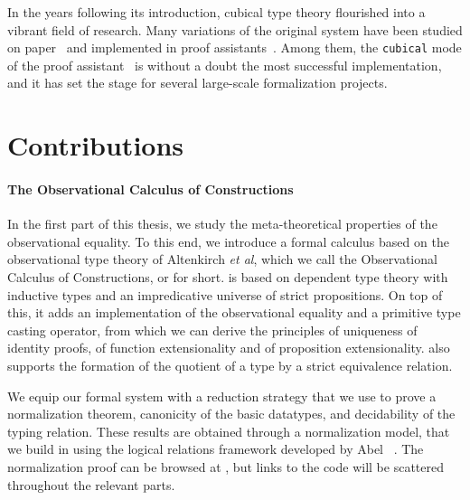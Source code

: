 In the years following its introduction, cubical type theory flourished into a 
vibrant field of research.
% 
Many variations of the original system have been studied on paper~\cite{AngiuliHouHarper18,ABCFHL}
and implemented in proof assistants~\cite{Cubicaltt, redtt}.
% 
Among them, the \texttt{cubical} mode of the \Agda proof assistant~
is without a doubt the most successful implementation, and it has set the stage for several 
large-scale formalization projects.


\section{Contributions}

\paragraph{The Observational Calculus of Constructions}
% 
In the first part of this thesis, we study the meta-theoretical properties of the observational 
equality.
% 
To this end, we introduce a formal calculus based on the observational type theory
of Altenkirch \textit{et al}, which we call the Observational Calculus of Constructions, or 
\SetoidCC for short.
% 
\SetoidCC is based on dependent type theory with inductive types and an impredicative 
universe of strict propositions. 
% 
On top of this, it adds an implementation of the observational equality and a 
primitive type casting operator, from which we can derive the principles of
uniqueness of identity proofs, of function extensionality and of proposition
extensionality.
% 
\SetoidCC also supports the formation of the quotient of a type by a strict 
equivalence relation.

We equip our formal system with a reduction strategy that we use to prove a normalization 
theorem, canonicity of the basic datatypes, and decidability of the typing
relation.
% 
These results are obtained through a normalization model, that we build in \Agda using
the logical relations framework developed by Abel \etal~.
% 
The normalization proof can be browsed at , but links to the code
will be scattered throughout the relevant parts.

